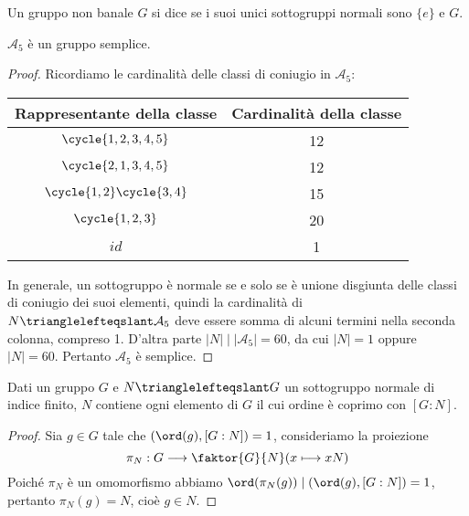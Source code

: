 \documentclass[11pt]{scrartcl}
\begin{document}
\begin{definition}
    Un gruppo non banale $G$ si dice  se i suoi unici sottogruppi
    normali sono $\{e\}$ e $G$.
\end{definition}


\begin{proposition}
    \label{prop1.61}
    $\mathcal{A}_5$ è un gruppo semplice.
\end{proposition}

\begin{proof}
    Ricordiamo le cardinalità delle classi di coniugio in $\mathcal{A}_5$:


    \begingroup
    \renewcommand{\arraystretch}{1.5}
    \begin{center}
    \begin{tabular}{c|c}
        Rappresentante della classe & Cardinalità della classe\\
        \hline
        $\cycle{1, 2, 3, 4, 5}$ & 12\\
        $\cycle{2, 1, 3, 4, 5}$ & 12\\
        $\cycle{1, 2}\cycle{3, 4}$ & 15\\
        $\cycle{1, 2, 3}$ & 20\\
        $id$ & 1 
    \end{tabular}
    \end{center}
    \endgroup
    In generale, un sottogruppo è normale se e solo se è unione disgiunta
    delle classi di coniugio dei suoi elementi, quindi la cardinalità
    di $N \trianglelefteqslant \mathcal{A}_5$ deve essere somma di alcuni 
    termini nella seconda colonna, compreso 1. D'altra parte $|N| \mid |\mathcal{A}_5| = 60$,
    da cui $|N| = 1$ oppure $|N| = 60$. Pertanto $\mathcal{A}_5$ è semplice.
\end{proof}

\begin{lemma}
    \label{lemma1.62}
    Dati un gruppo $G$ e $N\trianglelefteqslant G$ un sottogruppo normale di 
    indice finito, $N$ contiene ogni elemento di $G$ il cui ordine è coprimo
    con $[G:N]$.
\end{lemma}

\begin{proof}
    Sia $g \in G$ tale che $(\ord(g), [G:N]) = 1$, consideriamo la proiezione
    \[
        \pi_N:G \longrightarrow \faktor{G}{N} (x \longmapsto xN)
    \]
    Poiché $\pi_N$ è un omomorfismo abbiamo $\ord(\pi_N(g)) \mid (\ord(g), [G:N]) = 1$,
    pertanto $\pi_N(g) = N$, cioè $g \in N$.
\end{proof}
\end{document}

